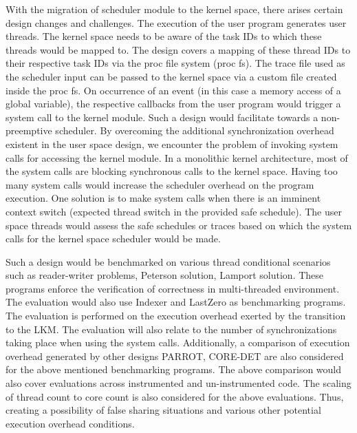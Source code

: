With the migration of scheduler module to the kernel space, there arises certain design changes and challenges. 
The execution of the user program generates user threads. 
The kernel space needs to be aware of the task IDs to which these threads would be mapped to. 
The design covers a mapping of these thread IDs to their respective task IDs via the proc file system (proc fs). 
The trace file used as the scheduler input can be passed to the kernel space via a custom file created inside the proc fs. 
On occurrence of an event (in this case a memory access of a global variable), the respective callbacks from the user program would trigger a system call to the kernel module. 
Such a design would facilitate towards a non-preemptive scheduler. 
By overcoming the additional synchronization overhead existent in the user space design, we encounter the problem of invoking system calls for accessing the kernel module. 
In a monolithic kernel architecture, most of the system calls are blocking synchronous calls to the kernel space. 
Having too many system calls would increase the scheduler overhead on the program execution. 
One solution is to make system calls when there is an imminent context switch (expected thread switch in the provided safe schedule). 
The user space threads would assess the safe schedules or traces based on which the system calls for the kernel space scheduler would be made. 


Such a design would be benchmarked on various thread conditional scenarios such as reader-writer problems, Peterson solution, Lamport solution. 
These programs enforce the verification of correctness in multi-threaded environment. 
The evaluation would also use Indexer and LastZero as benchmarking programs. 
The evaluation is performed on the execution overhead exerted by the transition to the LKM. 
The evaluation will also relate to the number of synchronizations taking place when using the system calls. 
Additionally, a comparison of execution overhead generated by other designs PARROT, CORE-DET are also considered for the above mentioned benchmarking programs. 
The above comparison would also cover evaluations across instrumented and un-instrumented code. 
The scaling of thread count to core count is also considered for the above evaluations.
Thus, creating a possibility of false sharing situations and various other potential execution overhead conditions. 
